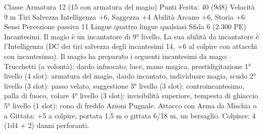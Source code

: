 \begin{multicols}{2}
Classe Armatura 12 (15 con armatura del magio)
\hspace*{0pt}\hfill{Punti Ferita}: 40 (9d8)
Velocità 9 m
Tiri Salvezza Intelligenza +6, Saggezza +4
Abilità Arcano +6, Storia +6
Sensi Percezione passiva 11
Lingue quattro lingue qualsiasi
Sfida 6 (2.300 PE)
Incantesimi. Il magio è un incantatore di 9° livello. La sua
abilità da incantatore è l’Intelligenza (DC dei tiri salvezza degli
incantesimi 14, +6 al colpire con attacchi con incantesimo). Il
magio ha preparato i seguenti incantesimi da mago:
Trucchetti (a volontà): dardo infuocato, luce, mano magica,
prestidigitazione
1° livello (4 slot): armatura del magio, dardo incantato,
individuare magia, scudo
2° livello (3 slot): passo velato, suggestione
3° livello (3 slot): controincantesimo, palla di fuoco, volare
4° livello (3 slot): invisibilità superiore, tempesta di ghiaccio
5° livello (1 slot): cono di freddo
Azioni
Pugnale. Attacco con Arma da Mischia o a Gittata: +5 a colpire,
portata 1,5 m o gittata 6/18 m, un bersaglio.
Colpisce: 4 (1d4 + 2) danni perforanti.
 

\end{multicols}
